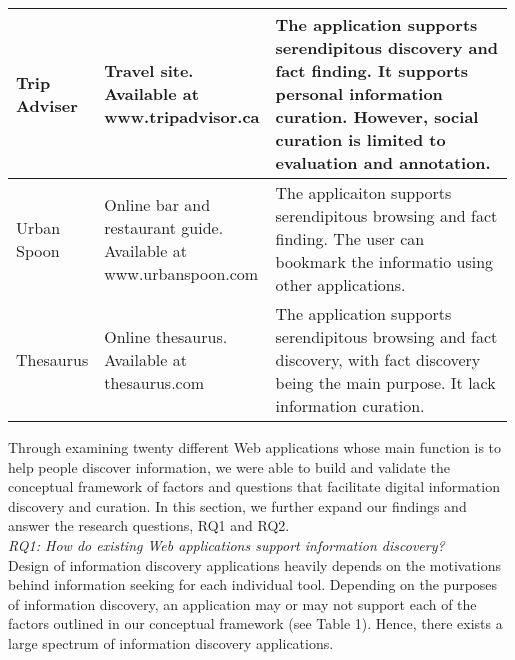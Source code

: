 \documentclass{casconpaper}
\begin{document}
{\begin{table*}[htbp]
\begin{tabular}{|p{0.11\linewidth}| p{0.22\linewidth}| p{0.66\linewidth}|}
\hline
Trip Adviser    & Travel site. Available at www.tripadvisor.ca                                 & The application supports serendipitous discovery and fact finding. It supports personal information curation. However, social curation is limited to evaluation and annotation.                                                                                                                                 \\
\hline
Urban Spoon     & Online bar and restaurant guide. Available at www.urbanspoon.com             & The applicaiton supports serendipitous browsing and fact finding. The user can bookmark the informatio using other applications.                                                                                                                                                                                \\
\hline
Thesaurus       & Online thesaurus. Available at thesaurus.com                                 & The application supports serendipitous browsing and fact discovery, with fact discovery being the main purpose. It lack information curation.                                                                                \\
\hline
\end{tabular}
\end{table*}

Through examining twenty different Web applications whose main function is to help people discover information, we were able to build and validate the conceptual framework of factors and questions that facilitate digital information discovery and curation. In this section, we further expand our findings and answer the research questions, RQ1 and RQ2. \\

\emph{RQ1: How do existing Web applications support information discovery?} \\

Design of information discovery applications heavily depends on the motivations behind information seeking for each individual tool. Depending on the purposes of information discovery, an application may or may not support each of the factors outlined in our conceptual framework (see Table 1). Hence, there exists a large spectrum of information discovery applications.

}
\end{document}
